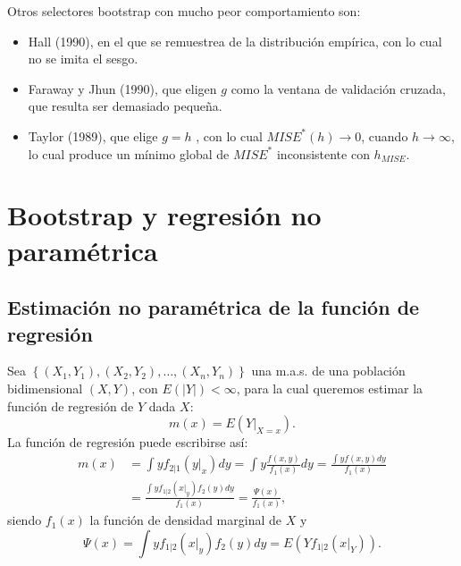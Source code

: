 \documentclass[]{book}
\theoremstyle{definition}
\theoremstyle{definition}
\theoremstyle{definition}
\theoremstyle{remark}
\begin{document}
Otros selectores bootstrap con mucho peor comportamiento son:

\begin{itemize}
\item
  Hall (1990), en el que se remuestrea de la distribución empírica, con
  lo cual no se imita el sesgo.
\item
  Faraway y Jhun (1990), que eligen \(g\) como la ventana de validación
  cruzada, que resulta ser demasiado pequeña.
\item
  Taylor (1989), que elige \(g=h\) , con lo cual
  \(MISE^{\ast}\left( h \right) \rightarrow 0\), cuando
  \(h\rightarrow \infty\), lo cual produce un mínimo global de
  \(MISE^{\ast}\) inconsistente con \(h_{MISE}\).
\end{itemize}

\chapter{Bootstrap y regresión no paramétrica}\label{cap7}

\section{Estimación no paramétrica de la función de
regresión}\label{estimacion-no-parametrica-de-la-funcion-de-regresion}

Sea
\(\left\{ \left( X_1,Y_1 \right),\left( X_2,Y_2 \right),\ldots ,\left( X_n,Y_n \right) \right\}\)
una m.a.s. de una población bidimensional \(\left( X,Y \right)\), con
\(E\left( \left\vert Y\right\vert  \right) <\infty\), para la cual
queremos estimar la función de regresión de \(Y\) dada \(X\):
\[m\left( x \right) =E\left( \left. Y\right\vert_{X=x} \right).\] La
función de regresión puede escribirse así: \[\begin{aligned}
m\left( x \right) &= \int yf_{2|1}\left( \left. y\right\vert _{x} \right)
dy=\int y\frac{f\left( x,y \right)}{f_1\left( x \right)}dy=\frac{\int
yf\left( x,y \right) dy}{f_1\left( x \right)} \\
&= \frac{\int yf_{1|2}\left( \left. x\right\vert _{y} \right) f_2\left(
y \right) dy}{f_1\left( x \right)}=\frac{\Psi \left( x \right)}{f_1\left(
x \right)},
\end{aligned}\] siendo \(f_1\left( x \right)\) la función de densidad
marginal de \(X\) y
\[\Psi \left( x \right) =\int yf_{1|2}\left( \left. x\right\vert _{y} \right)
f_2\left( y \right) dy=E\left( Yf_{1|2}\left( \left. x\right\vert_{Y} \right)
\right).\]
\end{document}
